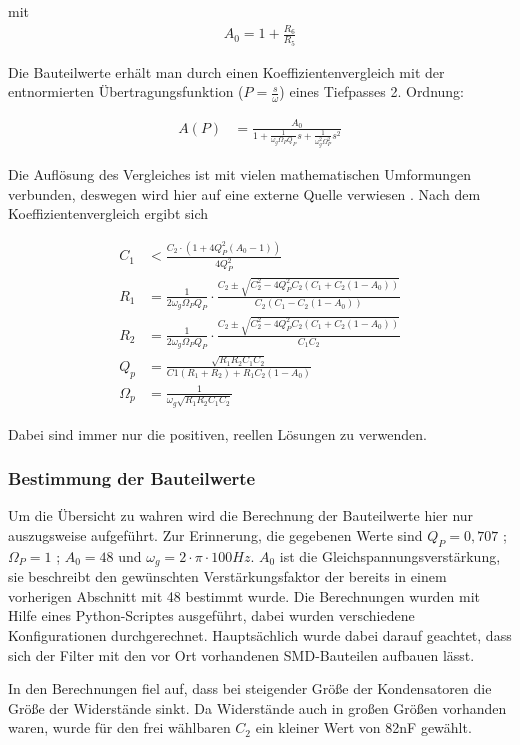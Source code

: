 mit
\begin{align*}
A_0=1+\frac{R_6}{R_5}
\end{align*}


Die Bauteilwerte erhält man durch einen Koeffizientenvergleich mit der entnormierten
Übertragungsfunktion ($P=\frac{s}{\omega}$) eines Tiefpasses 2. Ordnung:

\begin{align*}
A(P)&=\frac{A_0}{1+\frac{1}{\omega_g\Omega_PQ_P}s+\frac{1}{\omega_g^2\Omega_P^2}s^2}
\end{align*}

Die Auflösung des Vergleiches ist mit vielen mathematischen Umformungen verbunden, deswegen wird hier auf eine
externe Quelle verwiesen \cite[S. 102]{Krucker2000}.
Nach dem Koeffizientenvergleich ergibt sich

\begin{align*}
C_1&<\frac{C_2\cdot(1+4Q^2_P(A_0-1))}{4Q^2_P}\\
R_1&=\frac{1}{2\omega_g\Omega_PQ_P} \cdot \frac{C_2\pm\sqrt{C_2^2-4Q^2_PC_2(C_1+C_2(1-A_0))}}{C_2(C_1-C_2(1-A_0))}   \\
R_2&=\frac{1}{2\omega_g\Omega_PQ_P} \cdot \frac{C_2\pm\sqrt{C_2^2-4Q^2_PC_2(C_1+C_2(1-A_0))}}{C_1C_2}  \\
Q_p&=\frac{\sqrt{R_1R_2C_1C_2}}{C1(R_1+R_2)+R_1C_2(1-A_0)}\\
\Omega_p&=\frac{1}{\omega_g\sqrt{R_1R_2C_1C_2}}
\end{align*}

Dabei sind immer nur die positiven, reellen Lösungen zu verwenden.


\subsubsection{Bestimmung der Bauteilwerte}

Um die Übersicht zu wahren wird die Berechnung der Bauteilwerte hier nur auszugsweise aufgeführt. Zur Erinnerung,
die gegebenen Werte sind $Q_P=0,707$ ; $\Omega_P=1$ ; $A_0=48$ und $\omega_g = 2 \cdot \pi \cdot 100Hz$.
$A_0$ ist die Gleichspannungsverstärkung, sie beschreibt den gewünschten Verstärkungsfaktor der bereits in einem vorherigen
Abschnitt mit 48 bestimmt wurde. Die Berechnungen wurden mit Hilfe eines Python-Scriptes ausgeführt, dabei wurden verschiedene
Konfigurationen durchgerechnet. Hauptsächlich wurde dabei darauf geachtet, dass sich der Filter mit den vor Ort vorhandenen SMD-Bauteilen
aufbauen lässt.

In den Berechnungen fiel auf, dass bei steigender Größe der Kondensatoren die Größe der Widerstände sinkt. Da Widerstände auch in großen Größen vorhanden waren,
wurde für den frei wählbaren $C_2$ ein kleiner Wert von 82nF gewählt.

